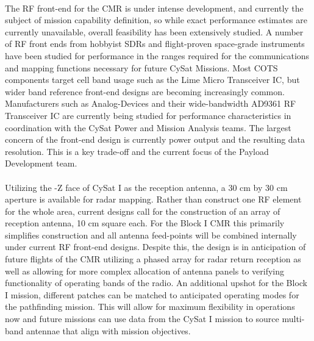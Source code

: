 \documentclass[nocover]            %
{CSLI}                       %
\begin{document}
\\The RF front-end for the CMR is under intense development, and currently the subject of mission capability definition, so while exact performance estimates are currently unavailable, overall feasibility has been extensively studied. A number of RF front ends from hobbyist SDRs and flight-proven space-grade instruments have been studied for performance in the ranges required for the communications and mapping functions necessary for future CySat Missions. Most COTS components target cell band usage such as the Lime Micro Transceiver IC, but wider band reference front-end designs are becoming increasingly common. Manufacturers such as Analog-Devices and their wide-bandwidth AD9361 RF Transceiver IC are currently being studied for performance characteristics in coordination with the CySat Power and Mission Analysis teams. The largest concern of the front-end design is currently power output and the resulting data resolution. This is a key trade-off and the current focus of the Payload Development team.\\
\\Utilizing the -Z face of CySat I as the reception antenna, a 30 cm by 30 cm aperture is available for radar mapping. Rather than construct one RF element for the whole area, current designs call for the construction of an array of reception antenna, 10 cm square each. For the Block I CMR this primarily simplifies construction and all antenna feed-points will be combined internally under current RF front-end designs. Despite this, the design is in anticipation of future flights of the CMR utilizing a phased array for radar return reception as well as allowing for more complex allocation of antenna panels to verifying functionality of operating bands of the radio. An additional upshot for the Block I mission, different patches can be matched to anticipated operating modes for the pathfinding mission. This will allow for maximum flexibility in operations now and future missions can use data from the CySat I mission to source multi-band antennae that align with mission objectives.
\end{document}
